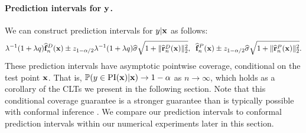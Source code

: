 \vspace{-1ex}
\paragraph{Prediction intervals for $\mathbf{y}$.} We can construct prediction intervals for $y | \mathbf{x}$ as follows:
\begin{equation*}
    \lambda^{-1}(1+\lambda q)\widehat{\mathbf{f}}_n^D(\mathbf{x}) \pm z_{1-\alpha/2}\lambda^{-1}(1+\lambda q)\widehat{\sigma}\sqrt{1+\lVert\widehat{\mathbf{r}}_n^D(\mathbf{x})\rVert_2^2},\;\; \widehat{\mathbf{f}}_n^P(\mathbf{x}) \pm z_{1-\alpha/2} \widehat{\sigma}\sqrt{1+\lVert\widehat{\mathbf{r}}_n^P(\mathbf{x})\rVert_2^2}.
    \label{eqn:prediction-intervals}
\end{equation*}
These prediction intervals have asymptotic pointwise coverage, conditional on the test point $\mathbf{x}$. That is, ${\mathbb{P}}(y \in \text{PI}(\mathbf{x}) | \mathbf{x}) \to 1-\alpha$ as $n \to \infty$, which holds as a corollary of the CLTs we present in the following section. Note that this conditional coverage guarantee is a stronger guarantee than is typically possible with conformal inference \citep{barber2020limitsdistributionfreeconditionalpredictive}. We compare our prediction intervals to conformal prediction intervals within our numerical experiments later in this section.


\vspace{-1ex}
